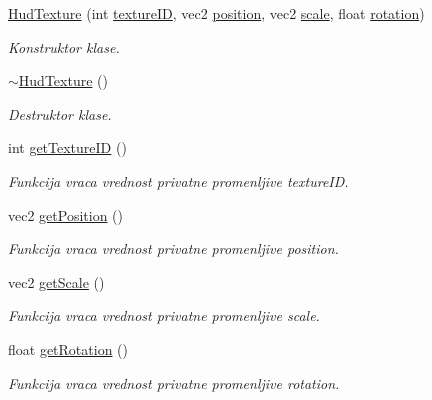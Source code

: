 \begin{DoxyCompactItemize}
\item 
\hyperlink{classhud_1_1HudTexture_a45488fac00a2f9e558bda7f71f526e66}{Hud\+Texture} (int \hyperlink{classhud_1_1HudTexture_a20e3ae1a3d5aa9c53a6ed33bce25ec2e}{texture\+ID}, vec2 \hyperlink{classhud_1_1HudTexture_af4151cf971b1e2cafb4368bc58f224eb}{position}, vec2 \hyperlink{classhud_1_1HudTexture_af4fb370dbaffb1604a886368daa72507}{scale}, float \hyperlink{classhud_1_1HudTexture_a79336d9ce1cc8ffb719355442b3b27c0}{rotation})
\begin{DoxyCompactList}\small\item\em Konstruktor klase. \end{DoxyCompactList}\item 
\hyperlink{classhud_1_1HudTexture_aecec374865e8979740e780c1a0d87677}{$\sim$\+Hud\+Texture} ()
\begin{DoxyCompactList}\small\item\em Destruktor klase. \end{DoxyCompactList}\item 
int \hyperlink{classhud_1_1HudTexture_a2ac36167c1f0e18fdc9ea125fb909074}{get\+Texture\+ID} ()
\begin{DoxyCompactList}\small\item\em Funkcija vraca vrednost privatne promenljive texture\+ID. \end{DoxyCompactList}\item 
vec2 \hyperlink{classhud_1_1HudTexture_a67e8c4c74a6131a931f828b00a79b82d}{get\+Position} ()
\begin{DoxyCompactList}\small\item\em Funkcija vraca vrednost privatne promenljive position. \end{DoxyCompactList}\item 
vec2 \hyperlink{classhud_1_1HudTexture_a3ad68d37457abc9456133e03b0835c40}{get\+Scale} ()
\begin{DoxyCompactList}\small\item\em Funkcija vraca vrednost privatne promenljive scale. \end{DoxyCompactList}\item 
float \hyperlink{classhud_1_1HudTexture_aa171b3bf1cb31ed030600beca32ed77c}{get\+Rotation} ()
\begin{DoxyCompactList}\small\item\em Funkcija vraca vrednost privatne promenljive rotation. \end{DoxyCompactList}\end{DoxyCompactItemize}

